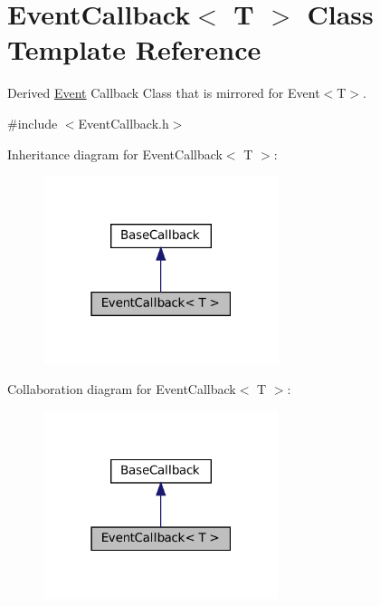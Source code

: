 \hypertarget{classEventCallback}{}\section{Event\+Callback$<$ T $>$ Class Template Reference}
\label{classEventCallback}


Derived \hyperlink{classEvent}{Event} Callback Class that is mirrored for Event$<$\+T$>$.  




{\ttfamily \#include $<$Event\+Callback.\+h$>$}



Inheritance diagram for Event\+Callback$<$ T $>$\+:
\nopagebreak
\begin{figure}[H]
\begin{center}
\leavevmode
\includegraphics[width=195pt]{classEventCallback__inherit__graph}
\end{center}
\end{figure}


Collaboration diagram for Event\+Callback$<$ T $>$\+:
\nopagebreak
\begin{figure}[H]
\begin{center}
\leavevmode
\includegraphics[width=195pt]{classEventCallback__coll__graph}
\end{center}
\end{figure}
